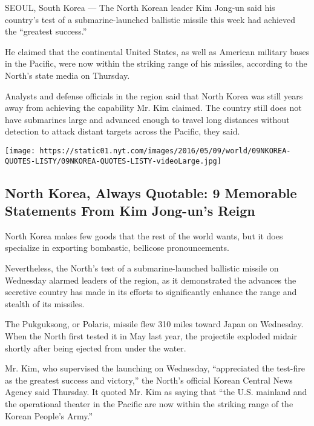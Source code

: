 SEOUL, South Korea --- The North Korean leader Kim Jong-un said his
country's test of a submarine-launched ballistic missile this week had
achieved the ``greatest success.''

He claimed that the continental United States, as well as American
military bases in the Pacific, were now within the striking range of his
missiles, according to the North's state media on Thursday.

Analysts and defense officials in the region said that North Korea was
still years away from achieving the capability Mr. Kim claimed. The
country still does not have submarines large and advanced enough to
travel long distances without detection to attack distant targets across
the Pacific, they said.

\href{https://www.nytimes.com/interactive/2016/world/asia/north-korea-kim-jong-un.html}{}

\texttt{[image: https://static01.nyt.com/images/2016/05/09/world/09NKOREA-QUOTES-LISTY/09NKOREA-QUOTES-LISTY-videoLarge.jpg]}

\hypertarget{north-korea-always-quotable-9-memorable-statements-from-kim-jong-uns-reign}{%
\subsection{North Korea, Always Quotable: 9 Memorable Statements From
Kim Jong-un's
Reign}\label{north-korea-always-quotable-9-memorable-statements-from-kim-jong-uns-reign}}

North Korea makes few goods that the rest of the world wants, but it
does specialize in exporting bombastic, bellicose pronouncements.

Nevertheless, the North's test of a submarine-launched ballistic missile
on Wednesday alarmed leaders of the region, as it demonstrated the
advances the secretive country has made in its efforts to significantly
enhance the range and stealth of its missiles.

The Pukguksong, or Polaris, missile flew 310 miles toward Japan on
Wednesday. When the North first tested it in May last year, the
projectile exploded midair shortly after being ejected from under the
water.

Mr. Kim, who supervised the launching on Wednesday, ``appreciated the
test-fire as the greatest success and victory,'' the North's official
Korean Central News Agency said Thursday. It quoted Mr. Kim as saying
that ``the U.S. mainland and the operational theater in the Pacific are
now within the striking range of the Korean People's Army.''

